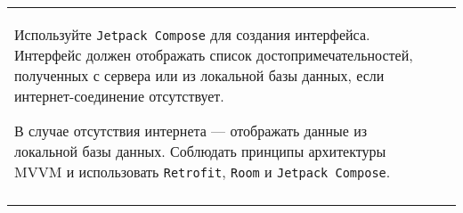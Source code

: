 \documentclass[a4paper]{article}
\begin{document}
\begin{tabular}{!{\vrule width 2pt}p{5cm}|p{6cm}|p{4cm}!{\vrule width 2pt}}
{\begin{minipage}{16cm}
\begin{enumerate}

Используйте \texttt{Jetpack Compose} для создания интерфейса. Интерфейс должен отображать список достопримечательностей, полученных с сервера или из локальной базы данных, если интернет-соединение отсутствует.


В случае отсутствия интернета — отображать данные из локальной базы данных.
Соблюдать принципы архитектуры MVVM и использовать \texttt{Retrofit}, \texttt{Room} и \texttt{Jetpack Compose}. 
\end{enumerate}

\vspace{0.2cm}
    
\end{minipage}
}
\\
\end{tabular}

\newpage
\end{document}
